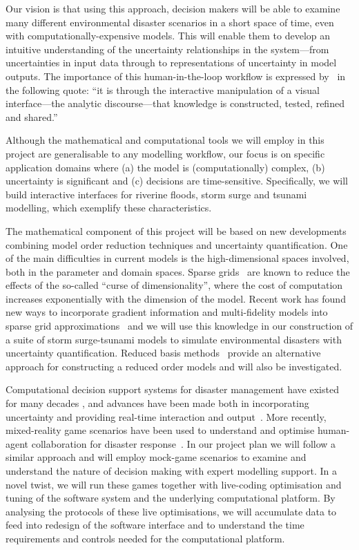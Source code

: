 Our vision is that using this approach, decision makers will be able
to examine many different environmental disaster scenarios in a short
space of time, even with computationally-expensive models. This will
enable them to develop an intuitive understanding of the uncertainty
relationships in the system---from uncertainties in input data through
to representations of uncertainty in model outputs. The importance of
this human-in-the-loop workflow is expressed by~\cite{pikeScience2009}
in the following quote: ``it is through the interactive manipulation
of a visual interface---the analytic discourse---that knowledge is
constructed, tested, refined and shared.''

Although the mathematical and computational tools we will employ in
this project are generalisable to any modelling workflow, our focus is
on specific application domains where (a) the model is
(computationally) complex, (b) uncertainty is significant and (c)
decisions are time-sensitive. Specifically, we will build interactive
interfaces for riverine floods, storm surge and tsunami modelling,
which exemplify these characteristics.

The mathematical component of this project will be based on new
developments combining model order reduction techniques and uncertainty
quantification. One of the main difficulties in current models is the
high-dimensional spaces involved, both in the parameter and domain
spaces. Sparse grids~\parencite{BungartzGriebel2004} are known to
reduce the effects of the so-called ``curse of dimensionality'', where
the cost of computation increases exponentially with the dimension of
the model. Recent work has found new ways to incorporate gradient
information and multi-fidelity models into sparse grid
approximations~\parencite{deBaarHarding2015,Jakeman2015,deBaarRDM2015}
and we will use this knowledge in our construction of a suite of
storm surge-tsunami models to simulate environmental disasters with
uncertainty quantification. Reduced basis 
methods~\parencite{quarteroni2015reduced} provide an alternative approach
for constructing a reduced order models and will also be investigated.

Computational decision support systems for disaster management have
existed for many decades \parencite{wallaceDecision1985}, and
advances have been made both in incorporating
uncertainty \parencite{thompsonSocial2014,nealeNavigating2015}
and providing real-time interaction and
output~\parencite{yuSupport2006}. More recently, mixed-reality game
scenarios have been used to understand and optimise human-agent
collaboration for disaster response~\parencite{ramchurn2016human}. In
our project plan we will follow a similar approach and will employ
mock-game scenarios to examine and understand the nature of decision
making with expert modelling support. In a novel twist, we will run
these games together with live-coding optimisation and tuning of the
software system and the underlying computational platform. By
analysing the protocols of these live optimisations, we will
accumulate data to feed into redesign of the software interface and to
understand the time requirements and controls needed for the
computational platform.


